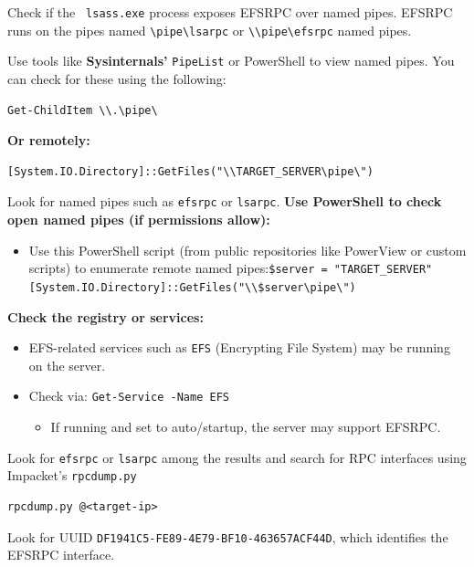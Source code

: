 Check if the \verb | lsass.exe| process exposes EFSRPC over named pipes. EFSRPC runs on the pipes named \verb|\pipe\lsarpc| or \verb|\\pipe\efsrpc| named pipes.

Use tools like \textbf{Sysinternals'} \texttt{PipeList} or PowerShell to view named pipes. You can check for these using the following:
    \begin{verbatim}
Get-ChildItem \\.\pipe\
    \end{verbatim}
\textbf{Or remotely:}
    \begin{verbatim}
[System.IO.Directory]::GetFiles("\\TARGET_SERVER\pipe\")
    \end{verbatim}
Look for named pipes such as \verb|efsrpc| or \verb|lsarpc|.
\textbf{Use PowerShell to check open named pipes (if permissions allow):}
    \begin{itemize}
        \item Use this PowerShell script (from public repositories like PowerView or custom scripts) to enumerate remote named pipes:\verb|$server = "TARGET_SERVER" [System.IO.Directory]::GetFiles("\\$server\pipe\") |
    \end{itemize}

\textbf{Check the registry or services:}
\begin{itemize} 
    \begin{itemize}
        \item  EFS-related services such as \verb|EFS| (Encrypting File System) may be running on the server.
    \end{itemize}
    \begin{itemize}
        \item  Check via: \verb|Get-Service -Name EFS | \begin{itemize}
            \item If running and set to auto/startup, the server may support EFSRPC.
        \end{itemize}
    \end{itemize}
\end{itemize}
 
Look for \texttt{efsrpc} or \texttt{lsarpc} among the results and search for RPC interfaces using Impacket's \texttt{rpcdump.py}
    \begin{verbatim}
rpcdump.py @<target-ip>
    \end{verbatim}
Look for UUID \texttt{DF1941C5-FE89-4E79-BF10-463657ACF44D}, which identifies the EFSRPC interface.

